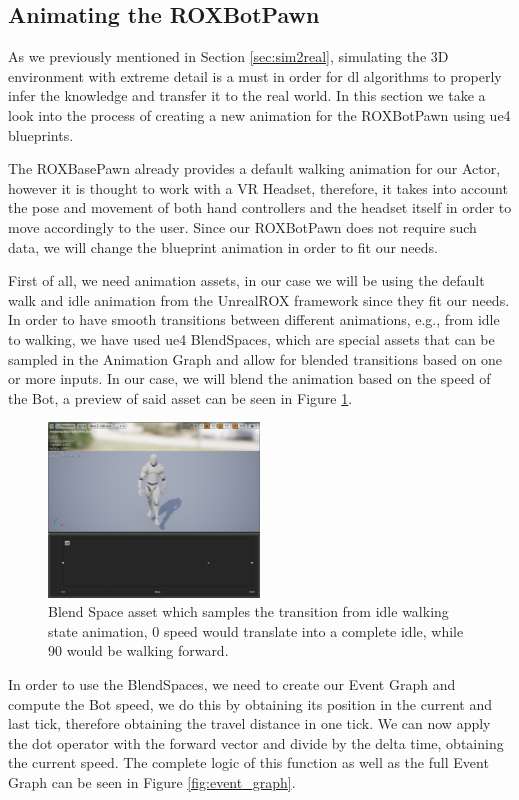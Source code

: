 \subsection{Animating the ROXBotPawn}
As we previously mentioned in Section \ref{sec:sim2real}, simulating the 3D environment with extreme detail is a must in order for \gls{dl} algorithms to properly infer the knowledge and transfer it to the real world. In this section we take a look into the process of creating a new animation for the ROXBotPawn using \gls{ue4} blueprints.

The ROXBasePawn already provides a default walking animation for our Actor, however it is thought to work with a VR Headset, therefore, it takes into account the pose and movement of both hand controllers and the headset itself in order to move accordingly to the user. Since our ROXBotPawn does not require such data, we will change the blueprint animation in order to fit our needs. 

First of all, we need animation assets, in our case we will be using the default walk and idle animation from the UnrealROX framework since they fit our needs. In order to have smooth transitions between different animations, e.g., from idle to walking, we have used \gls{ue4} BlendSpaces, which are special assets that can be sampled in the Animation Graph and allow for blended transitions based on one or more inputs. In our case,  we will blend the animation based on the speed of the Bot, a preview of said asset can be seen in Figure \ref{fig:blend_space}.

\begin{figure}[h]
	\includegraphics[width=0.5\textwidth]{archivos/blend_space.png}
	\centering
	\caption{Blend Space asset which samples the transition from idle walking state animation, 0 speed would translate into a complete idle, while 90 would be walking forward.}
	\label{fig:blend_space}
\end{figure}

In order to use the BlendSpaces, we need to create our Event Graph and compute the Bot speed, we do this by obtaining its position in the current and last tick, therefore obtaining the travel distance in one tick. We can now apply the dot operator with the forward vector and divide by the delta time, obtaining the current speed. The complete logic of this function as well as the full Event Graph can be seen in Figure \ref{fig:event_graph}.

